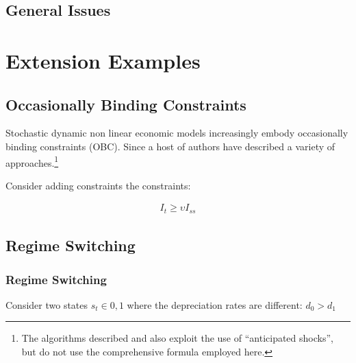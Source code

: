\documentclass[12pt]{article}
\begin{document}
\subsection{General Issues}
\label{sec:generalissues}





\section{Extension Examples}
\label{sec:extension}



\subsection{Occasionally Binding Constraints}
\label{sec:occbind}



\label{sec:obc-solut}

Stochastic dynamic non linear economic
models increasingly embody  occasionally binding constraints (OBC).
Since \cite{Christiano2000} a host of
authors have described a variety of approaches.\footnote{The algorithms described \cite{holden15:_exist_dsge} and \cite{guerrieri15:_occbin} also exploit the use of ``anticipated shocks'', but do not use the comprehensive formula employed here. }
\cite{holden15:_exist_dsge,guerrieri15:_occbin,benigno09,hintermaier10,brumm10,nakov08,haefke98,nakata12,gordon11,billi11,Hintermaier2010,Guerrieri2015}



Consider adding constraints the constraints:

\begin{gather*}
  I_t \ge \upsilon I_{ss}
\end{gather*}


\subsection{Regime Switching}
\label{sec:ressw}


\subsubsection{Regime Switching}


\label{sec:regime-switch-model}



Consider two states $s_t \in {0,1}$ where the depreciation rates are different:  $d_0>d_1$
\end{document}
